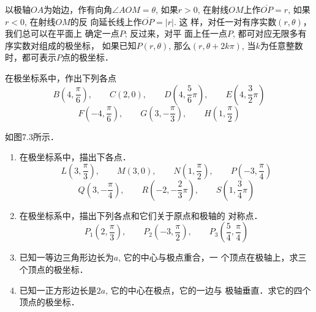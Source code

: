 以极轴$OA$为始边，作有向角$\angle AOM=\theta$, 如果$r>0$, 
在射线$OM$上作$\overline{OP}=r$, 
如果$r<0$, 在射线$OM$的反
向延长线上作$\overline{OP}=|r|$. 这
样，对任一对有序实数$(r,\theta)$，我们总可以在平面上
确定一点$P$; 反过来，对平
面上任一点$P$, 都可对应无限多有序实数对组成的极坐标，
如果已知$P(r,\theta)$, 那么$(r,\theta+2k\pi)$, 当$k$为任意整数
时，都可表示$P$点的极坐标．

\begin{example}
    在极坐标系中，作出下列各点
\[B\left(4,\frac{\pi}{6}\right),\qquad C(2,0),\qquad D\left(4,\frac{5}{6}\pi\right),\qquad E\left(4,\frac{3}{2}\pi\right)\]
\[F\left(-4,\frac{\pi}{6}\right),\qquad G\left(3,-\frac{\pi}{3}\right),\qquad H\left(1,\frac{\pi}{2}\right)\]
\end{example}

\begin{solution}
    如图7.3所示．
\begin{figure}[htp]
    \centering
{}   
    \caption{}
\end{figure}
\end{solution}

\begin{ex}
\begin{enumerate}
    \item 在极坐标系中，描出下各点．
  \[  L\left(3,\frac{\pi}{3}\right),\qquad  M(3,0),\qquad N\left(1,\frac{\pi}{2}\right),\qquad P\left(-3,\frac{\pi}{4}\right)\]
\[    Q\left(3, -\frac{\pi}{4}\right), \qquad R\left(-2,-\frac{2}{3}\pi\right),\qquad S\left(1,\frac{3}{4}\pi \right)\]
\item 在极坐标系中，描出下列各点和它们关于原点和极轴的
    对称点．
\[P_1\left(2,\frac{\pi}{3}\right),\qquad P_2\left(-3,\frac{\pi}{2}\right),\qquad P_3\left(\frac{5}{4},\frac{\pi}{4}\right)\]
    \item 已知一等边三角形边长为$a$, 它的中心与极点重合，一
    个顶点在极轴上，求三个顶点的极坐标．
    \item 已知一正方形边长是$2a$, 它的中心在极点，它的一边与
    极轴垂直．求它的四个顶点的极坐标．
\end{enumerate}
\end{ex}

